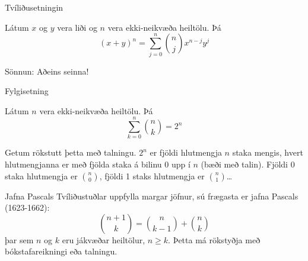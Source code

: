 \documentclass{beamer}
\begin{document}
\begin{frame}{Tvíliðusetningin}
\begin{tcolorbox}[title=Tvíliðusetningin (e. \emph{the binomial theorem})]
Látum $x$ og $y$ vera liði og $n$ vera ekki-neikvæða heiltölu. Þá
\[
 (x + y)^n = \sum_{j=0}^n \binom{n}{j} x^{n-j} y^j
\]
\end{tcolorbox}
Sönnun: Aðeins seinna!
\end{frame}

\begin{frame}{Fylgisetning}
\begin{tcolorbox}[title=Fylgisetning tvíliðusetningarinnar]
Látum $n$ vera ekki-neikvæða heiltölu. Þá
\[
 \sum_{k=0}^n \binom{n}{k} = 2^n
\]
\end{tcolorbox}
Getum rökstutt þetta með talningu. $2^n$ er fjöldi hlutmengja $n$ staka mengis, hvert hlutmengjanna er með fjölda staka á bilinu $0$ upp í $n$ (bæði með talin). Fjöldi 0 staka hlutmengja er $\binom{n}{0}$, fjöldi 1 staks hlutmengja er $\binom{n}{1}$\ldots
\end{frame}

\begin{frame}{Jafna Pascals}
Tvíliðustuðlar uppfylla margar jöfnur, sú frægasta er jafna Pascals (1623-1662):
\[
\binom{n+1}{k} = \binom{n}{k-1} + \binom{n}{k}
\]
þar sem $n$ og $k$ eru jákvæðar heiltölur, $n \geq k$. Þetta má rökstyðja með bókstafareikningi eða talningu.
\end{frame}
\end{document}
